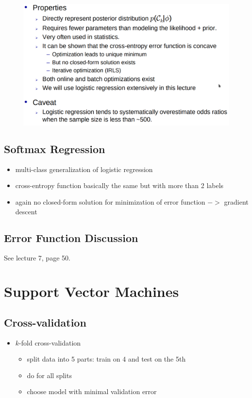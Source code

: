\documentclass{article}
\begin{document}
\begin{figure}[H]
  \centering
  \includegraphics[width=.5\textwidth]{logistic_regression_summary}
\end{figure}

\subsection{Softmax Regression}

\begin{itemize}
  \item multi-class generalization of logistic regression
  \item cross-entropy function basically the same but with more than 2 labels
  \item again no closed-form solution for minimization of error function $->$ gradient descent
\end{itemize}

\subsection{Error Function Discussion}

See lecture 7, page 50.

\section{Support Vector Machines}

\subsection{Cross-validation}

\begin{itemize}
  \item $k$-fold cross-validation
  \begin{itemize}
    \item split data into 5 parts: train on 4 and test on the 5th
    \item do for all splits
    \item choose model with minimal validation error
  \end{itemize}
\end{itemize}
\end{document}
